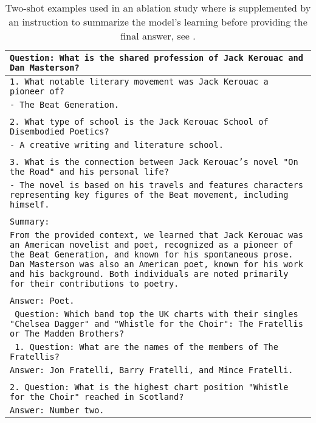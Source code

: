 \begin{table*}
    \caption{Two-shot examples used in an ablation study where \rephrase{} is supplemented by an instruction to summarize the model's learning before providing the final answer, see .}
    \centering
    \small
    \begin{tabular}{>{\raggedright\arraybackslash\tt}p{}<{}}
      \toprule
      Question: What is the shared profession of Jack Kerouac and Dan Masterson? \\
      \midrule
      1. What notable literary movement was Jack Kerouac a pioneer of? \\
      - The Beat Generation.\\
      \\
      2. What type of school is the Jack Kerouac School of Disembodied Poetics?\\
      - A creative writing and literature school.\\
      \\
      3. What is the connection between Jack Kerouac's novel "On the Road" and his personal life?\\
      - The novel is based on his travels and features characters representing key figures of the Beat movement, including himself.\\
      \\
      Summary:\\
      From the provided context, we learned that Jack Kerouac was an American novelist and poet, recognized as a pioneer of the Beat Generation, and known for his spontaneous prose. Dan Masterson was also an American poet, known for his work and his background. Both individuals are noted primarily for their contributions to poetry.\\
      \\
      Answer: Poet.\\
      \midrule
      Question: Which band top the UK charts with their singles "Chelsea Dagger" and "Whistle for the Choir": The Fratellis or The Madden Brothers? \\
      \midrule
      1. Question: What are the names of the members of The Fratellis? \\
      Answer: Jon Fratelli, Barry Fratelli, and Mince Fratelli.\\
      \\
      2. Question: What is the highest chart position "Whistle for the Choir" reached in Scotland?\\ 
      Answer: Number two.\\

\end{tabular}
\end{table*}
